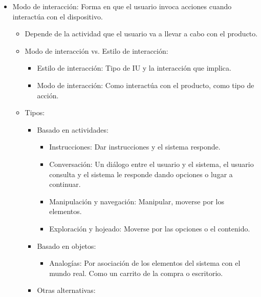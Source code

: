 \documentclass[12pt, twoside, openright]{report} %
\begin{document}
    \begin{itemize}
    
    \item
      Modo de interacción: Forma en que el usuario invoca acciones
      cuando interactúa con el dispositivo.

      \begin{itemize}
      
      \item
        Depende de la actividad que el usuario va a llevar a cabo con
        el producto.
      \item
        Modo de interacción vs. Estilo de interacción:

        \begin{itemize}
        
        \item
          Estilo de interacción: Tipo de IU y la interacción que
          implica.
        \item
          Modo de interacción: Como interactúa con el producto, como
          tipo de acción.
        \end{itemize}
      \item
        Tipos:

        \begin{itemize}
        
        \item
          Basado en actividades:

          \begin{itemize}
          
          \item
            Instrucciones: Dar instrucciones y el sistema responde.
          \item
            Conversación: Un diálogo entre el usuario y el sistema, el
            usuario consulta y el sistema le responde dando opciones o
            lugar a continuar.
          \item
            Manipulación y navegación: Manipular, moverse por los
            elementos.
          \item
            Exploración y hojeado: Moverse por las opciones o el
            contenido.
          \end{itemize}
        \item
          Basado en objetos:

          \begin{itemize}
          
          \item
            Analogías: Por asociación de los elementos del sistema con
            el mundo real. Como un carrito de la compra o escritorio.
          \end{itemize}
        \item
          Otras alternativas:


\end{itemize}
\end{itemize}
\end{itemize}
\end{document}
